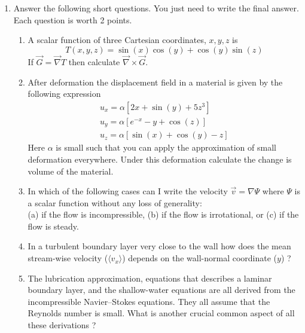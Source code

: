 \documentclass[12pt,a4paper]{article}
\begin{document}
\begin{enumerate}
\item \label{prb1} Answer the following short questions. You just need to write the final answer. Each question is worth 2 points. 
  \begin{enumerate}
  \item A scalar function of three Cartesian coordinates, $x,y,z$ is 
    \begin{equation}
       T(x,y,z) = \sin(x)\cos(y) + \cos(y)\sin(z)
    \end{equation}
    If $\vec{G} = \vec{\nabla} T $ then calculate $\vec{\nabla}\times \vec{G}$.
  \item After deformation the displacement field in a material is given by the following expression
    \begin{eqnarray}
      u_x = \alpha [2x + \sin(y) + 5z^3 ] \\
      u_y = \alpha[ e^{-x} - y + \cos(z) ] \\
      u_z = \alpha[ \sin(x) + \cos(y) -z ]
    \end{eqnarray}
    Here $\alpha$ is small such that you can apply the approximation of small deformation everywhere. 
    Under this deformation calculate the change is volume of the material.
  \item In which of the following cases can I write the velocity $\vec{v} = \nabla \Psi $ where $\Psi$ is a scalar function
    without any loss of generality: \\
    (a) if the flow is incompressible, (b) if the flow is irrotational, or (c) if the flow is steady.
  \item In a turbulent boundary layer very close to the wall how does the mean stream-wise
    velocity ($\langle v_x \rangle$) depends on the wall-normal coordinate ($y$) ? 
  \item The lubrication approximation, equations that describes a laminar boundary layer, and the
    shallow-water equations are all derived
    from the incompressible Navier--Stokes equations. 
    They all assume  that the Reynolds number is small. 
    What is another crucial common aspect of all these derivations  ?  
    \end{enumerate}


\end{enumerate}
\end{document}
